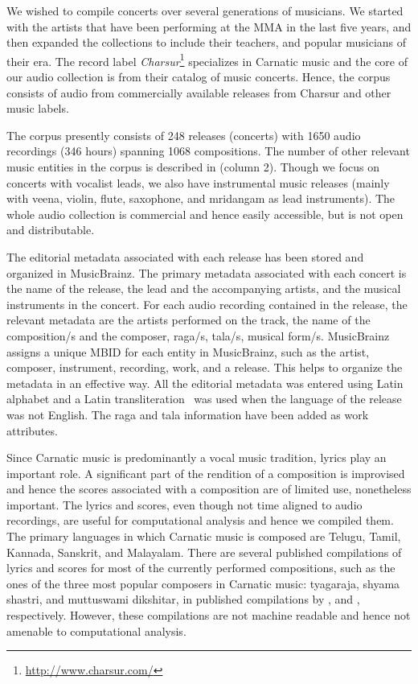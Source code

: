 We wished to compile concerts over several generations of musicians. We started with the artists that have been performing at the \gls{MMA} in the last five years, and then expanded the collections to include their teachers, and popular musicians of their era. The record label \textit{Charsur}\footnote{\url{http://www.charsur.com/}} specializes in Carnatic music and the core of our audio collection is from their catalog of music concerts. Hence, the corpus consists of audio from commercially available releases from Charsur and other music labels. 

The corpus presently consists of 248 releases (concerts) with 1650 audio recordings (346 hours) spanning 1068 compositions. The number of other relevant music entities in the corpus is described in  (column 2). Though we focus on concerts with vocalist leads, we also have instrumental music releases (mainly with \gls{veena}, violin, flute, saxophone, and mridangam as lead instruments). The whole audio collection is commercial and hence easily accessible, but is not open and distributable. %

The editorial metadata associated with each release has been stored and organized in MusicBrainz. The primary metadata associated with each concert is the name of the release, the lead and the accompanying artists, and the musical instruments in the concert. For each audio recording contained in the release, the relevant metadata are the artists performed on the track, the name of the composition/s and the composer, \gls{raga}/s, \gls{tala}/s, musical form/s. MusicBrainz assigns a unique \gls{MBID} for each entity in MusicBrainz, such as the artist, composer, instrument, recording, work, and a release. This helps to organize the metadata in an effective way. All the editorial metadata was entered using Latin alphabet and a Latin transliteration~\cite{iso:01:15919trans} was used when the language of the release was not English. The \gls{raga} and \gls{tala} information have been added as work attributes. 

Since Carnatic music is predominantly a vocal music tradition, lyrics play an important role. A significant part of the rendition of a composition is improvised and hence the scores associated with a composition are of limited use, nonetheless important. The lyrics and scores, even though not time aligned to audio recordings, are useful for computational analysis and hence we compiled them. The primary languages in which Carnatic music is composed are Telugu, Tamil, Kannada, Sanskrit, and Malayalam. There are several published compilations of lyrics and scores for most of the currently performed compositions, such as the ones of the three most popular composers in Carnatic music: \Gls{tyagaraja}, \Gls{shyama shastri}, and \Gls{muttuswami dikshitar}, in published compilations by ,  and , respectively. However, these compilations are not machine readable and hence not amenable to computational analysis. 

